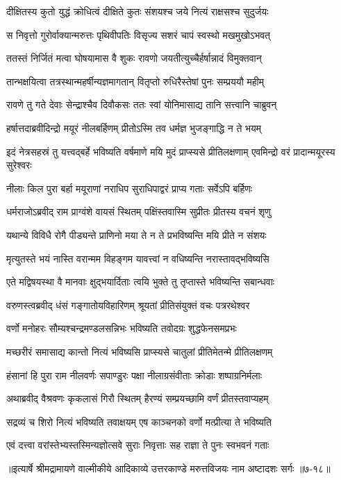 \twolineshloka
{दीक्षितस्य कुतो युद्धं क्रोधित्वं दीक्षिते कुतः}
{संशयश्च जये नित्यं राक्षसश्च सुदुर्जयः} %

\twolineshloka
{स निवृत्तो गुरोर्वाक्यान्मरुत्तः पृथिवीपतिः}
{विसृज्य सशरं चापं स्वस्थो मखमुखोऽभवत्} %

\twolineshloka
{ततस्तं निर्जितं मत्वा घोषयामास वै शुकः}
{रावणो जयतीत्युच्चैर्हर्षान्नादं विमुक्तवान्} %

\twolineshloka
{तान्भक्षयित्वा तत्रस्थान्महर्षीन्यज्ञमागतान्}
{वितृप्तो रुधिरैस्तेषां पुनः सम्प्रययौ महीम्} %

\twolineshloka
{रावणे तु गते देवाः सेन्द्राश्चैव दिवौकसः}
{ततः स्वां योनिमासाद्य तानि सत्त्वानि चाब्रुवन्} %

\twolineshloka
{हर्षात्तदाब्रवीदिन्द्रो मयूरं नीलबर्हिणम्}
{प्रीतोऽस्मि तव धर्मज्ञ भुजङ्गाद्धि न ते भयम्} %

\threelineshloka
{इदं नेत्रसहस्रं तु यत्त्वद्बर्हे भविष्यति}
{वर्षमाणे मयि मुदं प्राप्स्यसे प्रीतिलक्षणाम्}
{एवमिन्द्रो वरं प्रादान्मयूरस्य सुरेश्वरः} %

\twolineshloka
{नीलाः किल पुरा बर्हा मयूराणां नराधिप}
{सुराधिपाद्वरं प्राप्य गताः सर्वेऽपि बर्हिणः} %

\twolineshloka
{धर्मराजोऽब्रवीद् राम प्राग्वंशे वायसं स्थितम्}
{पक्षिंस्तवास्मि सुप्रीतः प्रीतस्य वचनं शृणु} %

\twolineshloka
{यथान्ये विविधै रोगै पीड्यन्ते प्राणिनो मया}
{ते न ते प्रभविष्यन्ति मयि प्रीते न संशयः} %

\twolineshloka
{मृत्युतस्ते भयं नास्ति वरान्मम विहङ्गम}
{यावत्त्वां न वधिष्यन्ति नरास्तावद्भविष्यसि} %

\twolineshloka
{एते मद्विषयस्था वै मानवाः क्षुद्भयार्दिताः}
{त्वयि भुक्ते तु तृप्तास्ते भविष्यन्ति सबान्धवाः} %

\twolineshloka
{वरुणस्त्वब्रवीद् धंसं गङ्गातोयविहारिणम्}
{श्रूयतां प्रीतिसंयुक्तं वचः पत्ररथेश्वर} %

\twolineshloka
{वर्णो मनोहरः सौम्यश्चन्द्रमण्डलसन्निभः}
{भविष्यति तवोदग्रः शुद्धफेनसमप्रभः} %

\twolineshloka
{मच्छरीरं समासाद्य कान्तो नित्यं भविष्यसि}
{प्राप्स्यसे चातुलां प्रीतिमेतन्मे प्रीतिलक्षणम्} %

\twolineshloka
{हंसानां हि पुरा राम नीलवर्णः सपाण्डुरः}
{पक्षा नीलाग्रसंवीताः क्रोडाः शष्पाग्रनिर्मलाः} %

\twolineshloka
{अथाब्रवीद् वैश्रवणः कृकलासं गिरौ स्थितम्}
{हैरण्यं सम्प्रयच्छामि वर्णं प्रीतस्तवाप्यहम्} %

\twolineshloka
{सद्रव्यं च शिरो नित्यं भविष्यति तवाक्षयम्}
{एष काञ्चनको वर्णो मत्प्रीत्या ते भविष्यति} %

\twolineshloka
{एवं दत्त्वा वरांस्तेभ्यस्तस्मिन्यज्ञोत्सवे सुराः}
{निवृत्ताः सह राज्ञा ते पुनः स्वभवनं गताः} %


॥इत्यार्षे श्रीमद्रामायणे वाल्मीकीये आदिकाव्ये उत्तरकाण्डे मरुत्तविजयः नाम अष्टादशः सर्गः ॥७-१८॥
